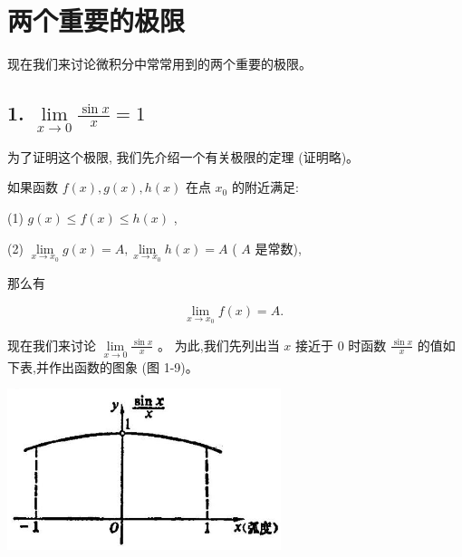 \documentclass[lang=cn,newtx,12pt,scheme=chinese]{elegantbook}
\begin{document}
\section{两个重要的极限}

现在我们来讨论微积分中常常用到的两个重要的极限。

\subsection*{1. \(\mathop{\lim }\limits_{{x \rightarrow 0}}\frac{\sin x}{x} = 1\)}

为了证明这个极限, 我们先介绍一个有关极限的定理 (证明略)。
\begin{theorem}[定理]
如果函数 \(f\left( x\right) ,g\left( x\right) ,h\left( x\right)\) 在点 \({x}_{0}\) 的附近满足:

(1) \(g\left( x\right) \leq f\left( x\right) \leq h\left( x\right)\) ,

(2) \(\mathop{\lim }\limits_{{x \rightarrow {x}_{0}}}g\left( x\right) = A,\mathop{\lim }\limits_{{x \rightarrow {x}_{0}}}h\left( x\right) = A\) ( \(A\) 是常数),

那么有

\[
\mathop{\lim }\limits_{{x \rightarrow {x}_{0}}}f\left( x\right) = A\text{. }
\]

\end{theorem}

现在我们来讨论 \(\mathop{\lim }\limits_{{x \rightarrow 0}}\frac{\sin x}{x}\) 。 为此,我们先列出当 \(x\) 接近于 0 时函数 \(\frac{\sin x}{x}\) 的值如下表,并作出函数的图象 (图 1-9)。

\begin{center}
\end{center}

\begin{center}
	\includegraphics[max width=0.6\textwidth]{images/01912c18-5c3f-733d-b775-749ba9897a9d_42_483969.jpg}
\end{center}
\end{document}
